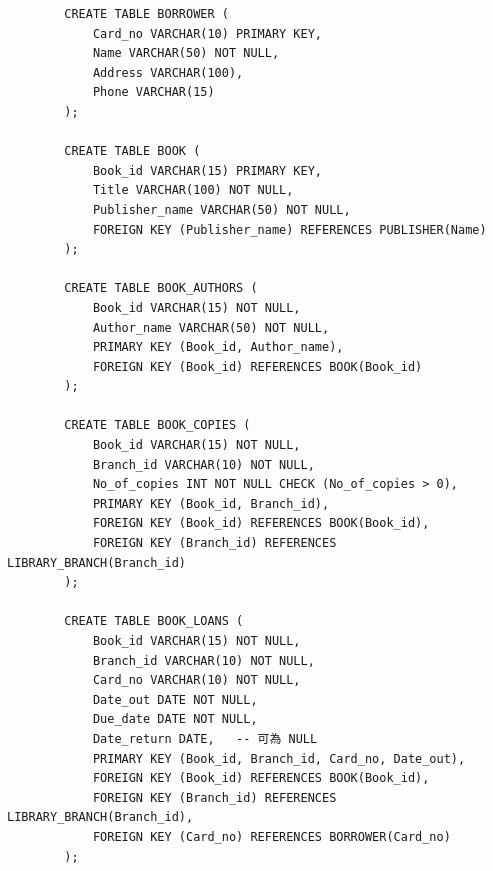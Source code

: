 \documentclass[12pt,a4paper]{article}
\begin{document}
\begin{enumerate}
\begin{enumerate}
\begin{verbatim}
        CREATE TABLE BORROWER (
            Card_no VARCHAR(10) PRIMARY KEY,
            Name VARCHAR(50) NOT NULL,
            Address VARCHAR(100),
            Phone VARCHAR(15) 
        );

        CREATE TABLE BOOK (
            Book_id VARCHAR(15) PRIMARY KEY,
            Title VARCHAR(100) NOT NULL,
            Publisher_name VARCHAR(50) NOT NULL,
            FOREIGN KEY (Publisher_name) REFERENCES PUBLISHER(Name)
        );

        CREATE TABLE BOOK_AUTHORS (
            Book_id VARCHAR(15) NOT NULL,
            Author_name VARCHAR(50) NOT NULL,
            PRIMARY KEY (Book_id, Author_name),
            FOREIGN KEY (Book_id) REFERENCES BOOK(Book_id)
        );

        CREATE TABLE BOOK_COPIES (
            Book_id VARCHAR(15) NOT NULL,
            Branch_id VARCHAR(10) NOT NULL,
            No_of_copies INT NOT NULL CHECK (No_of_copies > 0),
            PRIMARY KEY (Book_id, Branch_id),
            FOREIGN KEY (Book_id) REFERENCES BOOK(Book_id),
            FOREIGN KEY (Branch_id) REFERENCES LIBRARY_BRANCH(Branch_id)
        );

        CREATE TABLE BOOK_LOANS (
            Book_id VARCHAR(15) NOT NULL,
            Branch_id VARCHAR(10) NOT NULL,
            Card_no VARCHAR(10) NOT NULL,
            Date_out DATE NOT NULL,
            Due_date DATE NOT NULL,
            Date_return DATE,   -- 可為 NULL
            PRIMARY KEY (Book_id, Branch_id, Card_no, Date_out),
            FOREIGN KEY (Book_id) REFERENCES BOOK(Book_id),
            FOREIGN KEY (Branch_id) REFERENCES LIBRARY_BRANCH(Branch_id),
            FOREIGN KEY (Card_no) REFERENCES BORROWER(Card_no)
        );
        \end{verbatim}
    \end{enumerate}
\end{enumerate}
\end{document}
